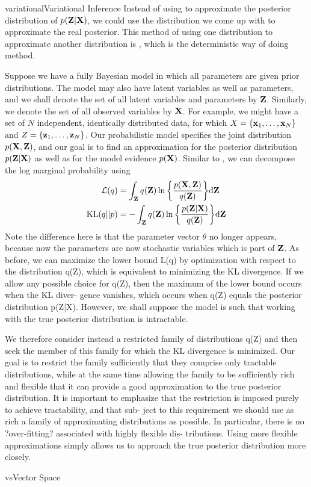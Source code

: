 \documentclass[9pt]{article}
\begin{document}
\begin{topic}{variational}{Variational Inference}
Instead of using  to approximate the posterior distribution of $p(\mathbf{Z}|\mathbf{X})$, we could use the distribution we come up with to approximate the real posterior. This method of using one distribution to approximate another distribution is , which is the deterministic way of doing  method.

Suppose we have a fully Bayesian model in which all parameters are given prior distributions. The model may also have latent variables as well as parameters, and we shall denote the set of all latent variables and parameters by $\mathbf{Z}$. Similarly, we denote the set of all observed variables by $\mathbf{X}$. For example, we might have a set of $N$ independent, identically distributed data, for which $X = \{\mathbf{x}_1,\ldots,\mathbf{x}_N\}$ and $Z = \{\mathbf{z}_1,\ldots,\mathbf{z}_N\}$. Our probabilistic model specifies the joint distribution $p(\mathbf{X}, \mathbf{Z})$, and our goal is to find an approximation for the posterior distribution $p(\mathbf{Z}|\mathbf{X})$ as well as for the model evidence $p(\mathbf{X})$. Similar to , we can decompose the log marginal probability using
\[
\begin{split}
\mathcal{L}(q) &= \int_{\mathbf{Z}} q(\mathbf{Z})\ln \bigg\{\frac{p(\mathbf{X},\mathbf{Z})}{q(\mathbf{Z})}\bigg\} \mathrm{d} \mathbf{Z}\\
\text{KL}(q||p) &= - \int_{\mathbf{Z}} q(\mathbf{Z})\ln \bigg\{\frac{p(\mathbf{Z}|\mathbf{X})}{q(\mathbf{Z})}\bigg\}\mathrm{d}\mathbf{Z}
\end{split}
\]
Note the difference here is that the parameter vector $\theta$ no longer appears, because now the parameters are now stochastic variables which is part of $\mathbf{Z}$. As before, we can maximize the lower bound L(q) by optimization with respect to the distribution q(Z), which is equivalent to minimizing the KL divergence. If we allow any possible choice for q(Z), then the maximum of the lower bound occurs when the KL diver- gence vanishes, which occurs when q(Z) equals the posterior distribution p(Z|X). However, we shall suppose the model is such that working with the true posterior distribution is intractable.

We therefore consider instead a restricted family of distributions q(Z) and then seek the member of this family for which the KL divergence is minimized. Our goal is to restrict the family sufficiently that they comprise only tractable distributions, while at the same time allowing the family to be sufficiently rich and flexible that it can provide a good approximation to the true posterior distribution. It is important to emphasize that the restriction is imposed purely to achieve tractability, and that sub- ject to this requirement we should use as rich a family of approximating distributions as possible. In particular, there is no ?over-fitting? associated with highly flexible dis- tributions. Using more flexible approximations simply allows us to approach the true posterior distribution more closely.
\end{topic}

\begin{topic}{vs}{Vector Space}
\Working
\end{topic}


\end{document}
